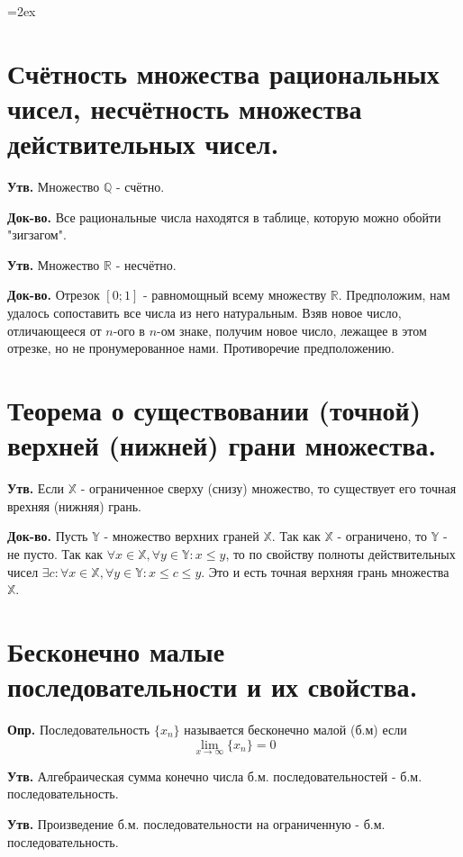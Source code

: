 \documentclass[a4paper,12pt]{article}
\begin{document}
\begin{flushleft}
\parskip=2ex
\section{Счётность множества рациональных чисел, несчётность множества действительных чисел.}

	\textbf{Утв.} Множество $\mathbb{Q}$ - счётно.
	
	\textbf{Док-во.} Все рациональные числа находятся в таблице, которую можно обойти "зигзагом".

	\textbf{Утв.} Множество $\mathbb{R}$ - несчётно.
	
	\textbf{Док-во.} Отрезок $[0; 1]$ - равномощный всему множеству $\mathbb{R}$. 
	Предположим, нам удалось сопоставить все числа из него натуральным. 
	Взяв новое число, отличающееся от $n$-ого в $n$-ом знаке, получим новое число, лежащее в этом отрезке, но не пронумерованное нами.
	Противоречие предположению. 

\section{Теорема о существовании (точной) верхней (нижней) грани множества.}

	\textbf{Утв.} Если $\mathbb{X}$ - ограниченное сверху (снизу) множество, то существует его точная врехняя (нижняя) грань.

	\textbf{Док-во.} Пусть $\mathbb{Y}$ - множество верхних граней $\mathbb{X}$. Так как $\mathbb{X}$ - ограничено, то $\mathbb{Y}$ - не пусто.
	Так как $\forall x \in \mathbb{X}, \forall y \in \mathbb{Y}: x \leq y$, то по свойству полноты действительных чисел $\exists c: \forall x \in \mathbb{X}, \forall y \in \mathbb{Y}: x \leq c \leq y$. Это и есть точная верхняя грань множества $\mathbb{X}$.
	
	\section{Бесконечно малые последовательности и их свойства.}

	\textbf{Опр.} Последовательность $\{x_n\}$ называется бесконечно малой (б.м) если 
	$$\lim_{x \to \infty} \{x_n\} = 0$$
	
	\textbf{Утв.} Алгебраическая сумма конечно числа б.м. последовательностей - б.м. последовательность.

	\textbf{Утв.} Произведение б.м. последовательности на ограниченную - б.м. последовательность.
	

\end{flushleft}
\end{document}
